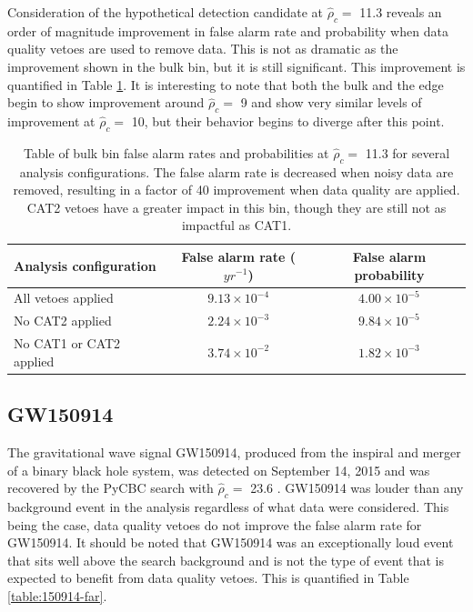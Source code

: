 Consideration of the hypothetical detection candidate at $\hat{\rho}_{c} =$ 11.3 reveals an
order of magnitude improvement
in false alarm rate and probability when data quality vetoes are used to remove data.
This is not as dramatic as
the improvement shown in the bulk bin, but it is still significant. This improvement is
quantified in Table \ref{table:edge-far}. It is interesting to note
that both the bulk and the edge begin to show improvement around $\hat{\rho}_{c} =$ 9 and
show very similar levels
of improvement at $\hat{\rho}_{c} =$ 10, but their behavior begins to diverge after this point.

\begin{table}[!ht]%
  \begin{center}
    \begin{tabular}{lcc}
      \hline
      Analysis configuration & False alarm rate ($yr^{-1}$) & False alarm probability \\ \hline
      All vetoes applied & $9.13\times10^{-4}$ & $4.00\times10^{-5}$ \\
      No CAT2 applied & $2.24\times10^{-3}$ & $9.84\times10^{-5}$ \\
      No CAT1 or CAT2 applied & $3.74\times10^{-2}$ & $1.82\times10^{-3}$ \\
      \hline
    \end{tabular}
  \end{center}
  \caption[Edge bin FAR - GW150914 analysis]{Table of bulk bin false alarm rates and probabilities at $\hat{\rho}_{c} =$ 11.3 %
           for several analysis configurations. %
           The false alarm rate is decreased when noisy data are removed, %
           resulting in a factor of 40 improvement when data quality are applied. CAT2 vetoes have a %
           greater impact in this bin, though they are still not as impactful as CAT1.}
  \label{table:edge-far}
\end{table}

\subsection{GW150914}

The gravitational wave signal GW150914, produced from the inspiral and merger of a binary black
hole system, was detected on September 14, 2015 and was recovered by the PyCBC search with
$\hat{\rho}_{c} =$ 23.6 \cite{GW150914-DETECTION}.
GW150914 was louder than
any background event in the analysis regardless of what data were considered. This being
the case, data quality vetoes do not improve the false alarm rate for GW150914. It should be
noted that GW150914 was an exceptionally loud event that sits well above the search background
and is not the type of event that is expected to benefit from data quality vetoes.
This is quantified in Table \ref{table:150914-far}.

